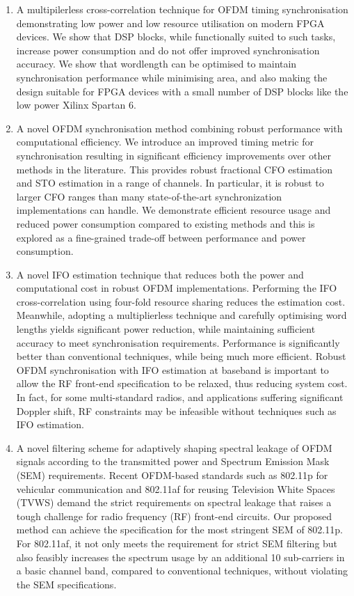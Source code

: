 \begin{enumerate}
\item A multipilerless cross-correlation technique for OFDM timing synchronisation demonstrating low power and low resource utilisation on modern FPGA devices.
We show that DSP blocks, while functionally suited to such tasks, increase power consumption and do not offer improved synchronisation accuracy.
We show that wordlength can be optimised to maintain synchronisation performance while minimising area, and also making the design suitable for FPGA devices with a small number of DSP blocks like the low power Xilinx Spartan 6.

\item A novel OFDM synchronisation method combining robust performance with computational efficiency.
We introduce an improved timing metric for synchronisation resulting in significant efficiency improvements over other methods in the literature.
This provides robust fractional CFO estimation and STO estimation in a range of channels.
In particular, it is robust to larger CFO ranges than many state-of-the-art synchronization implementations can handle.
We demonstrate efficient resource usage and reduced power consumption compared to existing methods and this is explored as a fine-grained trade-off between performance and power consumption.

\item A novel IFO estimation technique that reduces both the power and computational cost in robust OFDM implementations.
Performing the IFO cross-correlation using four-fold resource sharing reduces the estimation cost. Meanwhile, adopting a multiplierless technique and carefully optimising word lengths yields significant power reduction, while maintaining sufficient accuracy to meet synchronisation requirements.
Performance is significantly better than conventional techniques, while being much more efficient.
Robust OFDM synchronisation with IFO estimation at baseband is important to allow the RF front-end specification to be relaxed, thus reducing system cost.
In fact, for some multi-standard radios, and applications suffering significant Doppler shift, RF constraints may be infeasible without techniques such as IFO estimation.

\item A novel filtering scheme for adaptively shaping spectral leakage of OFDM signals according to the transmitted power and Spectrum Emission Mask (SEM) requirements.
Recent OFDM-based standards such as 802.11p for vehicular communication and 802.11af for reusing Television White Spaces (TVWS) demand the strict requirements on spectral leakage that raises a tough challenge for radio frequency (RF) front-end circuits.
Our proposed method can achieve the specification for the most stringent SEM of 802.11p.
For 802.11af, it not only meets the requirement for strict SEM filtering but also feasibly increases the spectrum usage by an additional 10 sub-carriers in a basic channel band, compared to conventional techniques, without violating the SEM specifications.


\end{enumerate}
